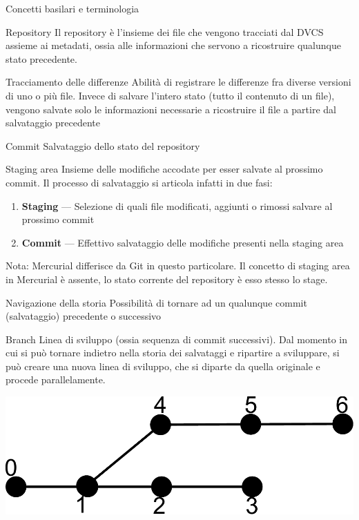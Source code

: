 \documentclass[presentation]{beamer}
\begin{document}
\begin{frame}[allowframebreaks]{Concetti basilari e terminologia}
	\begin{block}{Repository}
		Il repository è l'insieme dei file che vengono tracciati dal DVCS assieme ai metadati, ossia alle informazioni che servono a ricostruire qualunque stato precedente.
	\end{block}
	\begin{block}{Tracciamento delle differenze}
		Abilità di registrare le differenze fra diverse versioni di uno o più file. Invece di salvare l'intero stato (tutto il contenuto di un file), vengono salvate solo le informazioni necessarie a ricostruire il file a partire dal salvataggio precedente
	\end{block}
	\begin{block}{Commit}
		Salvataggio dello stato del repository
	\end{block}
	\begin{block}{Staging area}
		Insieme delle modifiche accodate per esser salvate al prossimo commit. Il processo di salvataggio si articola infatti in due fasi:
		\begin{enumerate}
			\item \textbf{Staging} --- Selezione di quali file modificati, aggiunti o rimossi salvare al prossimo commit
			\item \textbf{Commit} --- Effettivo salvataggio delle modifiche presenti nella staging area
		\end{enumerate}
		Nota: Mercurial differisce da Git in questo particolare. Il concetto di staging area in Mercurial è assente, lo stato corrente del repository è esso stesso lo stage.
	\end{block}
	\begin{block}{Navigazione della storia}
		Possibilità di tornare ad un qualunque commit (salvataggio) precedente o successivo
	\end{block}
	\begin{block}{Branch}
		Linea di sviluppo (ossia sequenza di commit successivi). Dal momento in cui si può tornare indietro nella storia dei salvataggi e ripartire a sviluppare, si può creare una nuova linea di sviluppo, che si diparte da quella originale e procede parallelamente.
		\begin{center}
			\includegraphics[height=.4\textheight]{img/branch}

\end{center}
\end{block}
\end{frame}
\end{document}
